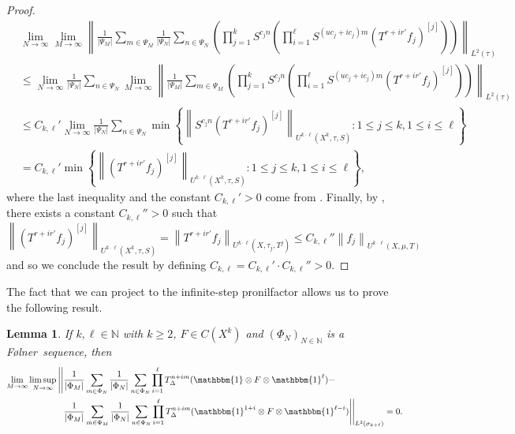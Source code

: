 \documentclass[letter, 11pt]{article}
\newcommand{\Folner}{F\o{}lner}
\newtheorem{lemma}[theo]{Lemma}
\theoremstyle{definition}
\theoremstyle{plain}
\newcommand{\N}{\mathbb{N}}
\newcommand{\norm}[1]{\left\lVert#1\right\rVert}
\providecommand{\norm}[1]{\lVert #1\rVert}
\newcommand{\1}{\mathbbm{1}}
\begin{document}
\begin{proof}
\begin{align*}
     &\lim_{N\to \infty}\lim_{M\to \infty}  \norm{ \frac{1}{|\Psi_M|} \sum_{m \in \Psi_M} \frac{1}{|\Psi_N|} \sum_{n \in \Psi_N} \left( \prod_{j=1}^{k} S^{c_jn} \left( \prod_{i=1}^{\ell} S^{(uc_j+ic_j)m} (T^{r+ir'}f_{j})^{[j]} \right) \right) }_{L^2(\tau)}\\
     &\leq \lim_{N\to \infty}\frac{1}{|\Psi_N|} \sum_{n \in \Psi_N} \lim_{M\to \infty}\norm{ \frac{1}{|\Psi_M|} \sum_{m \in \Psi_M}  \left( \prod_{j=1}^{k} S^{c_jn} \left( \prod_{i=1}^{\ell} S^{(uc_j+ic_j)m} (T^{r+ir'}f_{j})^{[j]} \right) \right) }_{L^2(\tau)}\\
    &\leq C_{k,\ell}'   \lim_{N\to \infty}\frac{1}{|\Psi_N|} \sum_{n \in \Psi_N} \min \left\{ \norm{S^{c_jn}(T^{r+ir'}f_{j})^{[j]}}_{U^{k \cdot \ell}(X^k,\tau, S)} \colon 1 \leq j \leq k , 1\leq i \leq \ell \right\} \\
    &= C_{k,\ell}' \min \left\{ \norm{(T^{r+ir'}f_{j})^{[j]}}_{U^{k \cdot \ell}(X^k,\tau, S)} \colon 1 \leq j \leq k , 1\leq i \leq \ell \right\},
\end{align*}
 where the last inequality and the constant $C_{k,\ell}'>0$ come from \cite[Lemma 6.7 (iii)]{kmrr25}.
Finally, by \cite[Lemma $6.7$(iv)]{kmrr25}, there exists a constant 
$C_{k,\ell}''>0$ such that
$$\norm{(T^{r+ir'}f_{j})^{[j]}}_{U^{k \cdot \ell}(X^k,\tau, S)} = \norm{T^{r+ir'}f_{j}}_{U^{k \cdot \ell}(X,\tau_j, T^j)} \leq C_{k,\ell}'' \norm{f_{j}}_{U^{k \cdot \ell}(X,\mu, T)}$$
and so we conclude the result by defining $C_{k,\ell}=C_{k,\ell}'\cdot C_{k,\ell}''>0$.
\end{proof}

The fact that we can project to the infinite-step pronilfactor allows 
us to prove the following result. 

\begin{lemma}\label{mrp-lemma}
    If $k,\ell \in \N$ with $k\geq 2$, $F\in C(X^{k})$ and $(\Phi_N)_{N\in \N}$ is a \Folner\ sequence, then  
    \begin{align*}
      \lim_{M\to \infty} \limsup_{N\to \infty}\Bigg|\Bigg|& \frac{1}{|\Phi_M|} \sum_{m\in \Phi_N} \frac{1}{|\Phi_N|} \sum_{n\in \Phi_N}  \prod_{i=1}^{\ell} T_\Delta^{n+im}  (\1 \otimes F\otimes \1^{\ell}) - \\
      &\frac{1}{|\Phi_M|} \sum_{m\in \Phi_M} \frac{1}{|\Phi_N|} \sum_{n\in \Phi_N} \prod_{i=1}^{\ell} T_\Delta^{n+im}  (\1^{1+i} \otimes F\otimes \1^{\ell-i})\Bigg|\Bigg|_{L^2(\sigma_{k+\ell})}=0. 
    \end{align*}

\end{lemma}
\end{document}
